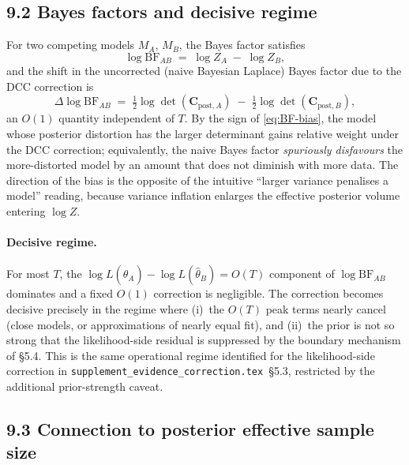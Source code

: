 \documentclass[11pt]{article}
\begin{document}
\subsection*{9.2 Bayes factors and decisive regime}

For two competing models $M_A$, $M_B$, the Bayes factor satisfies
\begin{equation}
\log\mathrm{BF}_{AB}
\;=\;
\log Z_A \;-\; \log Z_B,
\label{eq:BF-def}
\end{equation}
and the shift in the uncorrected (naive Bayesian Laplace) Bayes factor due to the DCC
correction is
\begin{equation}
\Delta\log\mathrm{BF}_{AB}
\;=\;
\tfrac{1}{2}\log\det(\mathbf C_{\mathrm{post},A})
\;-\;
\tfrac{1}{2}\log\det(\mathbf C_{\mathrm{post},B}),
\label{eq:BF-bias}
\end{equation}
an $O(1)$ quantity independent of $T$. By the sign of \eqref{eq:BF-bias}, the model whose
posterior distortion has the larger determinant gains relative weight under the DCC
correction; equivalently, the naive Bayes factor \emph{spuriously disfavours} the
more-distorted model by an amount that does not diminish with more data. The direction
of the bias is the opposite of the intuitive ``larger variance penalises a model'' reading,
because variance inflation enlarges the effective posterior volume entering $\log Z$.

\paragraph{Decisive regime.}
For most $T$, the $\log L(\hat\theta_A) - \log L(\hat\theta_B) = O(T)$ component of
$\log\mathrm{BF}_{AB}$ dominates and a fixed $O(1)$ correction is negligible. The
correction becomes decisive precisely in the regime where (i)~the $O(T)$ peak terms nearly
cancel (close models, or approximations of nearly equal fit), and (ii)~the prior is not
so strong that the likelihood-side residual is suppressed by the boundary mechanism of
\S5.4. This is the same operational regime identified for the likelihood-side correction
in \texttt{supplement\_evidence\_correction.tex}~\S5.3, restricted by the additional
prior-strength caveat.

\subsection*{9.3 Connection to posterior effective sample size}
\end{document}

